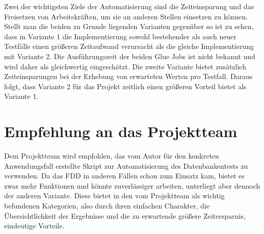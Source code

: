 Zwei der wichtigsten Ziele der Automatisierung sind die Zeiteinsparung und das Freisetzen von Arbeitskräften, um sie an anderen Stellen einsetzen zu können. Stellt man die beiden zu Grunde liegenden Varianten gegenüber so ist zu sehen, dass in Variante 1 die Implementierung sowohl bestehender als auch neuer Testfälle einen größeren Zeitaufwand verursacht als die gleiche Implementierung mit Variante 2. Die Ausführungszeit der beiden Glue Jobs ist nicht bekannt und wird daher als gleichwertig eingeschätzt. Die zweite Variante bietet zusätzlich Zeiteinsparungen bei der Erhebung von erwarteten Werten pro Testfall. Daraus folgt, dass Variante 2 für das Projekt zeitlich einen größeren Vorteil bietet als Variante 1.

\section{Empfehlung an das Projektteam}
Dem Projektteam wird empfohlen, das vom Autor für den konkreten Anwendungsfall erstellte Skript zur Automatisierung des Datenbankentests zu verwenden. Da das \ac{FDD} in anderen Fällen schon zum Einsatz kam, bietet es zwar mehr Funktionen und könnte zuverlässiger arbeiten, unterliegt aber dennoch der anderen Variante. Diese bietet in den vom Projektteam als wichtig befundenen Kategorien, also durch ihren einfachen Charakter, die Übersichtlichkeit der Ergebnisse und die zu erwartende größere Zeitersparnis, eindeutige Vorteile. 
